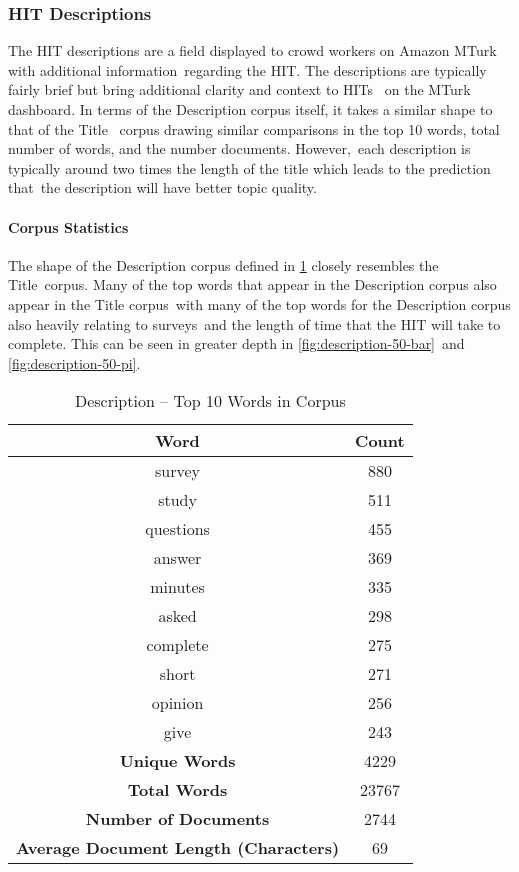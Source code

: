 \documentclass[letterpaper,12pt]{article}
\begin{document}
\subsubsection{HIT Descriptions}
The HIT descriptions are a field displayed to crowd workers on Amazon MTurk with additional information\
regarding the HIT. The descriptions are typically fairly brief but bring additional clarity and context to HITs \
on the MTurk dashboard. In terms of the Description corpus itself, it takes a similar shape to that of the Title \
corpus drawing similar comparisons in the top 10 words, total number of words, and the number documents. However,\
each description is typically around two times the length of the title which leads to the prediction that\
the description will have better topic quality.

\paragraph{Corpus Statistics}
The shape of the Description corpus defined in \ref{tab:description_top_words} closely resembles the Title\
corpus. Many of the top words that appear in the Description corpus also appear in the Title corpus\
with many of the top words for the Description corpus also heavily relating to surveys\
and the length of time that the HIT will take to complete. This can be seen in greater depth in \ref{fig:description-50-bar}\
and \ref{fig:description-50-pi}.

\begin{table}
	\caption{\label{tab:description_top_words} Description -- Top 10 Words in Corpus}
	\begin{center}
		\begin{tabular}{|c|c|}
			\hline
			\textbf{Word} & \textbf{Count} \\
			\hline
			survey & 880 \\
			\hline
			study & 511 \\
			\hline
			questions & 455 \\
			\hline
			answer & 369 \\
			\hline
			minutes & 335 \\
			\hline
			asked & 298 \\
			\hline
			complete & 275 \\
			\hline
			short & 271 \\
			\hline
			opinion & 256 \\
			\hline
			give & 243 \\
			\hline
			\textbf{Unique Words} & 4229 \\
			\hline
			\textbf{Total Words} & 23767 \\
			\hline
			\textbf{Number of Documents} & 2744 \\
			\hline
			\textbf{Average Document Length (Characters)} & 69 \\
			\hline
		\end{tabular}
	\end{center}
\end{table}
\end{document}
